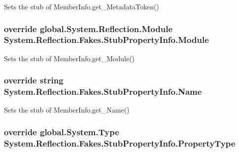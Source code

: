 Sets the stub of Member\-Info.\-get\-\_\-\-Metadata\-Token()

\hypertarget{class_system_1_1_reflection_1_1_fakes_1_1_stub_property_info_a48f513b5e71c1c950103005de87b2d2a}{
\subsubsection[{Module}]{\setlength{\rightskip}{0pt plus 5cm}override global.\-System.\-Reflection.\-Module System.\-Reflection.\-Fakes.\-Stub\-Property\-Info.\-Module\hspace{0.3cm}{\ttfamily [get]}}}\label{class_system_1_1_reflection_1_1_fakes_1_1_stub_property_info_a48f513b5e71c1c950103005de87b2d2a}


Sets the stub of Member\-Info.\-get\-\_\-\-Module()

\hypertarget{class_system_1_1_reflection_1_1_fakes_1_1_stub_property_info_abcbce73409715f6b8bb3a94b01a93694}{
\subsubsection[{Name}]{\setlength{\rightskip}{0pt plus 5cm}override string System.\-Reflection.\-Fakes.\-Stub\-Property\-Info.\-Name\hspace{0.3cm}{\ttfamily [get]}}}\label{class_system_1_1_reflection_1_1_fakes_1_1_stub_property_info_abcbce73409715f6b8bb3a94b01a93694}


Sets the stub of Member\-Info.\-get\-\_\-\-Name()

\hypertarget{class_system_1_1_reflection_1_1_fakes_1_1_stub_property_info_a53f2526f53f88e939ce448dee0ec2de4}{
\subsubsection[{Property\-Type}]{\setlength{\rightskip}{0pt plus 5cm}override global.\-System.\-Type System.\-Reflection.\-Fakes.\-Stub\-Property\-Info.\-Property\-Type\hspace{0.3cm}{\ttfamily [get]}}}\label{class_system_1_1_reflection_1_1_fakes_1_1_stub_property_info_a53f2526f53f88e939ce448dee0ec2de4}


